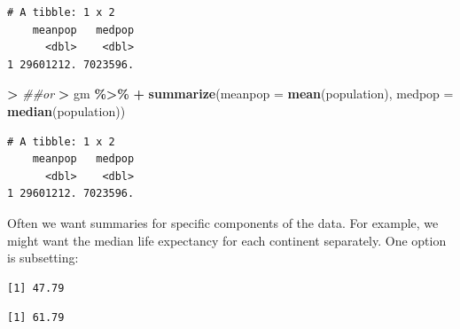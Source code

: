 \documentclass[
]{krantz}
\makeatletter
\newenvironment{Shaded}{\begin{snugshade}}{\end{snugshade}}
\newcommand{\CommentTok}[1]{\textcolor[rgb]{0.37,0.37,0.37}{\textit{#1}}}
\newcommand{\DataTypeTok}[1]{\textcolor[rgb]{0.27,0.27,0.27}{#1}}
\newcommand{\ErrorTok}[1]{\textcolor[rgb]{0.14,0.14,0.14}{\textbf{#1}}}
\newcommand{\KeywordTok}[1]{\textcolor[rgb]{0.27,0.27,0.27}{\textbf{#1}}}
\newcommand{\NormalTok}[1]{#1}
\newcommand{\OperatorTok}[1]{\textcolor[rgb]{0.43,0.43,0.43}{\textbf{#1}}}
\newcommand{\StringTok}[1]{\textcolor[rgb]{0.5,0.5,0.5}{#1}}
\newenvironment{kframe}{%
\medskip{}
\setlength{\fboxsep}{.8em}
 \def\at@end@of@kframe{}%
 \ifinner\ifhmode%
  \def\at@end@of@kframe{\end{minipage}}%
  \begin{minipage}{\columnwidth}%
 \fi\fi%
 \def\FrameCommand##1{\hskip\@totalleftmargin \hskip-\fboxsep
 \colorbox{shadecolor}{##1}\hskip-\fboxsep
     \hskip-\linewidth \hskip-\@totalleftmargin \hskip\columnwidth}%
 \MakeFramed {\advance\hsize-\width
   \@totalleftmargin\z@ \linewidth\hsize
   \@setminipage}}%
 {\par\unskip\endMakeFramed%
 \at@end@of@kframe}
\renewenvironment{Shaded}{\begin{kframe}}{\end{kframe}}
\makeatother
\begin{document}
\begin{verbatim}
# A tibble: 1 x 2
    meanpop   medpop
      <dbl>    <dbl>
1 29601212. 7023596.
\end{verbatim}

\begin{Shaded}
\begin{Highlighting}[]
\OperatorTok{\textgreater{}}\StringTok{ }\CommentTok{\#\#or}
\ErrorTok{\textgreater{}}\StringTok{ }\NormalTok{gm }\OperatorTok{\%\textgreater{}\%}\StringTok{ }
\OperatorTok{+}\StringTok{   }\KeywordTok{summarize}\NormalTok{(}\DataTypeTok{meanpop =} \KeywordTok{mean}\NormalTok{(population), }\DataTypeTok{medpop =} \KeywordTok{median}\NormalTok{(population))}
\end{Highlighting}
\end{Shaded}

\begin{verbatim}
# A tibble: 1 x 2
    meanpop   medpop
      <dbl>    <dbl>
1 29601212. 7023596.
\end{verbatim}

Often we want summaries for specific components of the data. For example, we might want the median life expectancy for each continent separately. One option is subsetting:

\begin{Shaded}
\end{Shaded}

\begin{verbatim}
[1] 47.79
\end{verbatim}

\begin{Shaded}
\end{Shaded}

\begin{verbatim}
[1] 61.79
\end{verbatim}

\begin{Shaded}
\end{Shaded}
\end{document}
